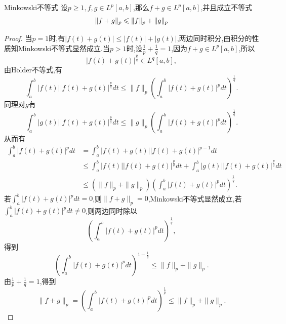 \documentclass[lang=cn,18pt]{elegantbook}
\begin{document}
\begin{theorem}{Minkowski不等式}
    设$p\geqslant 1,f,g \in L^p[a,b]$,那么$f+g \in L^p[a,b]$,并且成立不等式
    $$\Arrowvert f + g \Arrowvert_{p} \leqslant \Arrowvert f\Arrowvert_{p} + \Arrowvert g \Arrowvert_{p}$$
\end{theorem}
\begin{proof}
    当$p=1$时,有$|f(t)+g(t)| \leqslant |f(t)|+|g(t)|$,两边同时积分,由积分的性质知Minkowski不等式显然成立.当$p>1$时,设$\frac{1}{p}+\frac{1}{q}=1$,因为$f+g\in L^p[a,b]$,所以
    $$|f(t)+g(t)|^{\frac{p}{q}}\in L^{q}[a,b],$$
    由H$\ddot{\text{o}}$lder不等式,有
    $$\int_{a}^{b}|f(t)||f(t)+g(t)|^{\frac{p}{q}}dt \leqslant \|f\|_p \left(\int_{a}^{b}|f(t)+g(t)|^{p}dt\right)^{\frac{1}{q}}.$$
    同理对$g$有
$$\int_{a}^{b}|g(t)||f(t)+g(t)|^{\frac{p}{q}}dt \leqslant \|g\|_p \left(\int_{a}^{b}|f(t)+g(t)|^{p}dt\right)^{\frac{1}{q}}.$$
    从而有
    \begin{align*}
        \int_{a}^{b}|f(t)+g(t)|^{p}dt & =\int_{a}^{b}|f(t)+g(t)||f(t)+g(t)|^{p-1}dt \\
        & \leqslant \int_{a}^{b}|f(t)||f(t)+g(t)|^{\frac{p}{q}}dt+ \int_{a}^{b}|g(t)||f(t)+g(t)|^{\frac{p}{q}}dt \\
        & \leqslant (\|f\|_p + \|g\|_p)\left(\int_{a}^{b}|f(t)+g(t)|^pdt \right)^{\frac{1}{q}}.
    \end{align*}
    若$\int_{a}^{b}|f(t)+g(t)|^p dt =0 $,则$\|f +g\|_{p}=0$,Minkowski不等式显然成立,若$\int_{a}^{b}|f(t)+g(t)|^p dt \not=0$,则两边同时除以
    $$\left(\int_{a}^{b}|f(t)+g(t)|^p dt\right)^{\frac{1}{q}},$$
    得到
    $$\left(\int_{a}^{b}|f(t)+g(t)|^p dt\right)^{1-\frac{1}{q}} \leqslant \|f\|_p +\|g\|_p .$$
    由$\frac{1}{p}+\frac{1}{q}=1$,得到
    $$\|f+g\|_p = \left(\int_{a}^{b}|f(t)+g(t)|^p dt\right)^{\frac{1}{p}} \leqslant \|f\|_p +\|g\|_p .$$
\end{proof}
\end{document}
